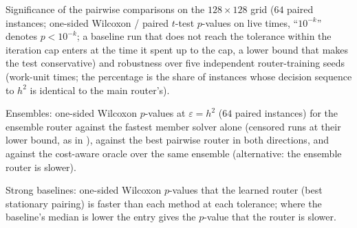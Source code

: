 \begin{table}[H]
\color{red}
\centering
\caption{Significance of the pairwise comparisons on the $128\times 128$ grid ($64$ paired instances; one-sided Wilcoxon / paired $t$-test $p$-values on live times, ``$10^{-k}$'' denotes $p<10^{-k}$; a baseline run that does not reach the tolerance within the iteration cap enters at the time it spent up to the cap, a lower bound that makes the test conservative) and robustness over five independent router-training seeds (work-unit times; the percentage is the share of instances whose decision sequence to $h^2$ is identical to the main router's).}
\resizebox{\textwidth}{!}{\castats}
\label{tab:ca_stats}
\end{table}

\begin{table}[H]
\color{red}
\centering
\caption{Ensembles: one-sided Wilcoxon $p$-values at $\varepsilon = h^2$ ($64$ paired instances) for the ensemble router against the fastest member solver alone (censored runs at their lower bound, as in ), against the best pairwise router in both directions, and against the cost-aware oracle over the same ensemble (alternative: the ensemble router is slower).}
\resizebox{\textwidth}{!}{\castatsens}
\label{tab:ca_stats_ens}
\end{table}

\begin{table}[H]
\color{red}
\centering
\caption{Strong baselines: one-sided Wilcoxon $p$-values that the learned router (best stationary pairing) is faster than each method at each tolerance; where the baseline's median is lower the entry gives the $p$-value that the router is slower.}
\resizebox{0.8\textwidth}{!}{\castatsbase}
\label{tab:ca_stats_base}
\end{table}


